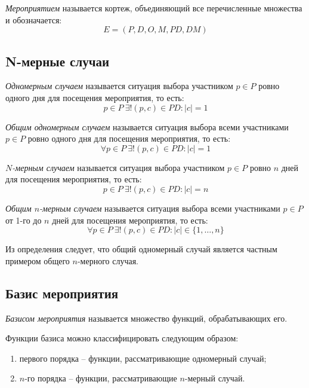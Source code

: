 \textit{Мероприятием} называется кортеж, объединяющий все перечисленные множества и обозначается:
\begin{equation}
	E = (P, D, O, M, PD, DM)
\end{equation}

\subsection{N-мерные случаи}

\textit{Одномерным случаем} называется ситуация выбора участником $p \in P$ ровно одного дня для посещения мероприятия, то есть:
\begin{equation}
	p \in P \ \exists! (p, c) \in PD: |c| = 1
\end{equation}

\textit{Общим одномерным случаем} называется ситуация выбора всеми участниками $p \in P$ ровно одного дня для посещения мероприятия, то есть:
\begin{equation}
	\forall p \in P \ \exists! (p, c) \in PD: |c| = 1
\end{equation}

\textit{$N$-мерным случаем} называется ситуация выбора участником $p \in P$ ровно $n$ дней для посещения мероприятия, то есть:
\begin{equation}
	p \in P \ \exists! (p, c) \in PD: |c| = n
\end{equation}

\textit{Общим $n$-мерным случаем} называется ситуация выбора всеми участниками $p \in P$ от 1-го до $n$ дней для посещения мероприятия, то есть:
\begin{equation}
	\forall p \in P \ \exists! (p, c) \in PD: |c| \in \{1, \dots, n\}
\end{equation}

Из определения следует, что общий одномерный случай является частным примером общего $n$-мерного случая.

\subsection{Базис мероприятия}

\textit{Базисом мероприятия} называется множество функций, обрабатывающих его.

Функции базиса можно классифицировать следующим образом:
\begin{enumerate}
	\item первого порядка -- функции, рассматривающие одномерный случай;
	\item $n$-го порядка -- функции, рассматривающие $n$-мерный случай.
\end{enumerate}

